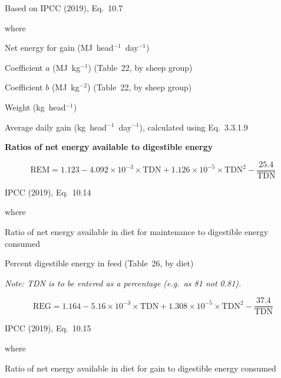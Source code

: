 \noindent Based on IPCC (2019), Eq.~10.7

\noindent where
\begin{description}[font=\normalfont, leftmargin=9em, style=sameline, nosep]
    \item[$\mathrm{NE}_{\mathrm{gain}}$] Net energy for gain (MJ~head$^{-1}$~day$^{-1}$)
    \item[$a$] Coefficient $a$ (MJ~kg$^{-1}$) (Table~22, by sheep group)
    \item[$b$] Coefficient $b$ (MJ~kg$^{-2}$) (Table~22, by sheep group)
    \item[$\mathrm{Weight}$] Weight (kg~head$^{-1}$)
    \item[$\mathrm{ADG}$] Average daily gain (kg~head$^{-1}$~day$^{-1}$), calculated
          using Eq.~3.3.1.9
\end{description}

\bigskip
\noindent\textbf{Ratios of net energy available to digestible energy}

\begin{equation}
    \mathrm{REM} = 1.123 - 4.092 \times 10^{-3} \times \mathrm{TDN}
        + 1.126 \times 10^{-5} \times \mathrm{TDN}^{2}
        - \frac{25.4}{\mathrm{TDN}}
    \tag{Eq.\ 3.3.1.11}
\end{equation}

\noindent IPCC (2019), Eq.~10.14

\noindent where
\begin{description}[font=\normalfont, leftmargin=6em, style=sameline, nosep]
    \item[$\mathrm{REM}$] Ratio of net energy available in diet for maintenance to
          digestible energy consumed
    \item[$\mathrm{TDN}$] Percent digestible energy in feed (Table~26, by diet)
\end{description}

\noindent\textit{Note: TDN is to be entered as a percentage (e.g.\ as 81 not 0.81).}

\begin{equation}
    \mathrm{REG} = 1.164 - 5.16 \times 10^{-3} \times \mathrm{TDN}
        + 1.308 \times 10^{-5} \times \mathrm{TDN}^{2}
        - \frac{37.4}{\mathrm{TDN}}
    \tag{Eq.\ 3.3.1.12}
\end{equation}

\noindent IPCC (2019), Eq.~10.15

\noindent where
\begin{description}[font=\normalfont, leftmargin=6em, style=sameline, nosep]
    \item[$\mathrm{REG}$] Ratio of net energy available in diet for gain to
          digestible energy consumed
\end{description}

